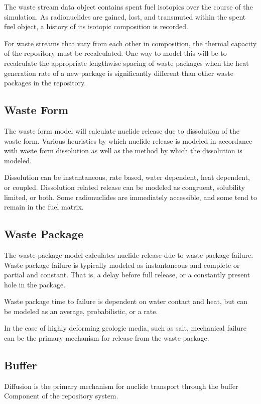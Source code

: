The waste stream data object contains spent fuel isotopics over the 
course of the simulation. As radionuclides are gained, lost, and transmuted within 
the spent fuel object, a history of its isotopic composition is recorded.

For waste streams that vary from each other in composition, the thermal capacity 
of the repository must be recalculated. One way to model this will be to 
recalculate the appropriate lengthwise spacing of waste packages when the heat 
generation rate of a new package is significantly different than other waste 
packages in the repository. 

\subsection{Waste Form}
The waste form model will calculate nuclide release due to dissolution 
of the waste form. Various heuristics by which nuclide release is modeled in 
accordance with waste form dissolution as well as the method by which 
the dissolution is modeled.

Dissolution can be instantaneous, rate based, water dependent, heat 
dependent, or coupled.  Dissolution related release can be modeled as congruent, solubility 
limited, or both. Some radionuclides are immediately accessible, and some 
tend to remain in the fuel matrix. 

\subsection{Waste Package}
The waste package model calculates nuclide release due to waste 
package failure. Waste package failure is typically modeled as 
instantaneous and complete or partial and constant. That is, a delay 
before full release, or a constantly present hole in the package.

Waste package time to failure is dependent on water contact and heat, 
but can be modeled as an average, probabilistic, or a rate.

In the case of highly deforming geologic media, such as salt, 
mechanical failure can be the primary mechanism for release from the 
waste package.

\subsection{Buffer}
Diffusion is the primary mechanism for nuclide transport through the 
buffer Component of the repository system.  

